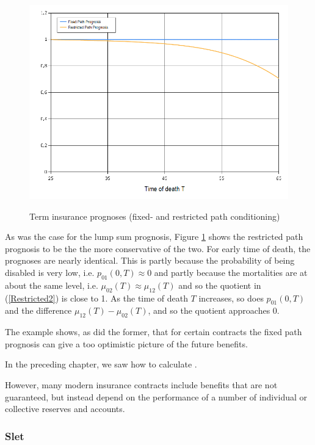\documentclass{article}
\newcommand{\1}[1]{\mathbbm{1}_{\left\lbrace #1 \right\rbrace}}
\theoremstyle{break}
\theoremstyle{remark}
\numberwithin{equation}{section}
\begin{document}
\begin{figure}[H]
	\centering
	\caption{Term insurance prognoses (fixed- and restricted path conditioning)}
	\includegraphics[width=\textwidth]{Term} \label{Term}
\end{figure}

As was the case for the lump sum prognosis, Figure \ref{Term} shows the restricted path prognosis to be the the more conservative of the two. For early time of death, the prognoses are nearly identical. This is partly because the probability of being disabled is very low, i.e. $p_{01}(0,T) \approx 0$ and partly because the mortalities are at about the same level, i.e. $\mu_{02}(T) \approx \mu_{12}(T)$ and so the quotient in (\ref{Restricted2}) is close to 1. As the time of death $T$ increases, so does $p_{01}(0,T)$ and the difference $\mu_{12}(T) - \mu_{02}(T)$, and so the quotient approaches 0.

The example shows, as did the former, that for certain contracts the fixed path prognosis can give a too optimistic picture of the future benefits.

In the preceding chapter, we saw how to calculate .

However, many modern insurance contracts include benefits that are not guaranteed, but instead depend on the performance of a number of individual or collective reserves and accounts. 

\subsubsection{Slet}
\end{document}
